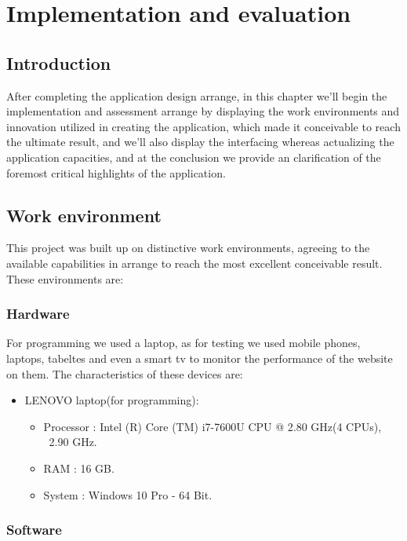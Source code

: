 \chapter{Implementation and evaluation}

\section{ Introduction}
After completing the application design arrange, in this chapter we'll begin the implementation and assessment arrange by displaying the work environments and innovation utilized in creating the application, which made it conceivable to reach the ultimate result, and we'll also display the interfacing whereas actualizing the application capacities, and at the conclusion we provide an clarification of the foremost critical highlights of the application. \\


\section{Work environment}
This project was built up on distinctive work environments, agreeing to the available capabilities in arrange to reach the most excellent conceivable result. These environments are:\\

\subsection{Hardware}
For programming we used a laptop, as for testing we used mobile phones, laptops, tabeltes and even a smart tv to monitor the performance of the website on them. The characteristics of
these devices are:
\begin{itemize}
	\item LENOVO laptop(for programming):
	\begin{itemize}
		\item Processor : Intel (R) Core (TM) i7-7600U CPU @ 2.80 GHz(4 CPUs), ~2.90 GHz.
		\item RAM : 16 GB.
		\item System : Windows 10 Pro - 64 Bit.
	\end{itemize}
\end{itemize}



\subsection{Software}

